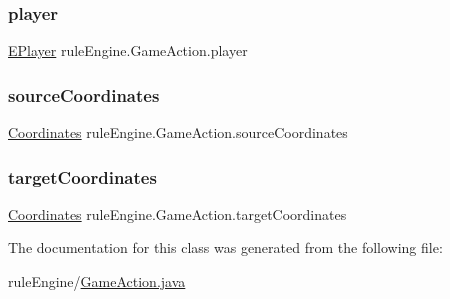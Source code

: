 \subsubsection{\texorpdfstring{player}{player}}
{\footnotesize\ttfamily \mbox{\hyperlink{enumgame_1_1_e_player}{E\+Player}} rule\+Engine.\+Game\+Action.\+player\hspace{0.3cm}{\ttfamily [private]}}

\mbox{\label{classrule_engine_1_1_game_action_a1a40c889fd4342784fe240fa9c2cea87}} 
\subsubsection{\texorpdfstring{source\+Coordinates}{sourceCoordinates}}
{\footnotesize\ttfamily \mbox{\hyperlink{classrule_engine_1_1_coordinates}{Coordinates}} rule\+Engine.\+Game\+Action.\+source\+Coordinates\hspace{0.3cm}{\ttfamily [private]}}

\mbox{\label{classrule_engine_1_1_game_action_ad75ba1f8ff9ecb3c40e5c082edeeef2e}} 
\subsubsection{\texorpdfstring{target\+Coordinates}{targetCoordinates}}
{\footnotesize\ttfamily \mbox{\hyperlink{classrule_engine_1_1_coordinates}{Coordinates}} rule\+Engine.\+Game\+Action.\+target\+Coordinates\hspace{0.3cm}{\ttfamily [private]}}



The documentation for this class was generated from the following file\+:\begin{DoxyCompactItemize}
\item 
rule\+Engine/\mbox{\hyperlink{_game_action_8java}{Game\+Action.\+java}}\end{DoxyCompactItemize}
